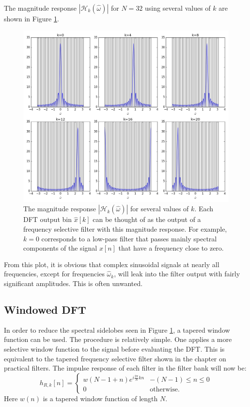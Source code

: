 The magnitude response $|\mathcal{H}_{k}(\hat{\omega})|$ for $N=32$
using several values of $k$ are shown in Figure \ref{fig:dft_freq_resp}.
\begin{figure}
\begin{center}
\includegraphics[width=\textwidth]{ch16/figures/fft_freqresp.png}
\end{center}
\caption{The magnitude response $|\mathcal{H}_k(\hat{\omega})|$ for several values of $k$. Each DFT output bin $\hat{x}[k]$ can be thought of as the output of a frequency selective filter with this magnitude response. For example, $k=0$ corresponds to a low-pass filter that passes mainly spectral components of the signal $x[n]$ that have a frequency close to zero.}
\label{fig:dft_freq_resp}
\end{figure}

From this plot, it is obvious that complex sinusoidal signals at
nearly all frequencies, except for frequencies $\hat{\omega}_{k}$, will
leak into the filter output with fairly significant amplitudes. This
is often unwanted.

\subsection{Windowed DFT}

In order to reduce the spectral sidelobes seen in
Figure \ref{fig:dft_freq_resp}, a tapered window function can be
used. The procedure is relatively simple. One applies a more selective
window function to the signal before evaluating the DFT. This is
equivalent to the tapered frequency selective filter shown in the
chapter on practical filters. The impulse response of each filter in
the filter bank will now be:
\begin{equation}
h_{R,k}[n] =\left\{ \begin{array}{cc}
w(N-1 + n)e^{i \frac{2\pi}{N}k n} & -(N-1) \le n \le 0\\
0 & \mathrm{otherwise}.
\end{array}
\right.
\end{equation}
Here $w(n)$ is a tapered window function of length $N$. 

